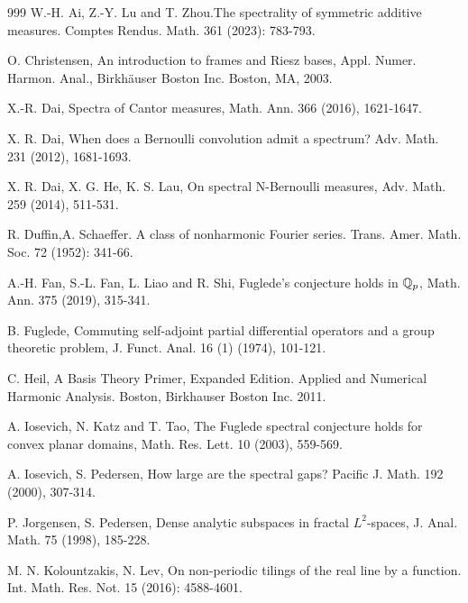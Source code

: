 \documentclass[12pt,psfig,reqno]{amsart}
\numberwithin{equation}{section}
\theoremstyle{plain}
\begin{document}
\begin{thebibliography}{999}
	 W.-H. Ai, Z.-Y. Lu and T. Zhou.The spectrality of symmetric additive measures. Comptes
	Rendus. Math. 361 (2023): 783-793.
	
 O. Christensen, An introduction to frames and Riesz bases, Appl. Numer. Harmon. Anal.,
Birkh\"{a}user Boston Inc. Boston, MA, 2003.

X.-R. Dai, Spectra of Cantor measures, Math. Ann.  366 (2016), 1621-1647.

 X. R. Dai, When does a Bernoulli convolution admit a spectrum? Adv. Math. 231 (2012), 1681-1693.

 X. R. Dai, X. G. He, K. S. Lau, On spectral N-Bernoulli measures, Adv. Math. 259 (2014), 511-531.





 R. Duffin,A. Schaeffer. A class of nonharmonic Fourier series. Trans. Amer. Math. Soc. 72 (1952): 341-66.

A.-H. Fan, S.-L. Fan, L. Liao and R. Shi, Fuglede's conjecture holds in $\Bbb Q_p$, Math. Ann. 375 (2019), 315-341.

B. Fuglede, Commuting self-adjoint partial differential operators and a group theoretic problem, J. Funct. Anal. 16 (1) (1974), 101-121.

C. Heil, A Basis Theory Primer, Expanded Edition. Applied and Numerical Harmonic Analysis. Boston, Birkhauser Boston Inc. 2011. 

A. Iosevich, N. Katz and T. Tao, The Fuglede spectral conjecture holds for convex planar domains, Math. Res. Lett. 10 (2003), 559-569.

A. Iosevich, S. Pedersen, How large are the spectral gaps? Pacific J. Math. 192 (2000), 307-314.

P. Jorgensen, S. Pedersen, Dense analytic subspaces in fractal $L^2$-spaces, J. Anal. Math. 75 (1998), 185-228.

 M. N. Kolountzakis, N. Lev, On non-periodic tilings of the real line by a function.
Int. Math. Res. Not. 15 (2016): 4588-4601.


\end{thebibliography}
\end{document}
